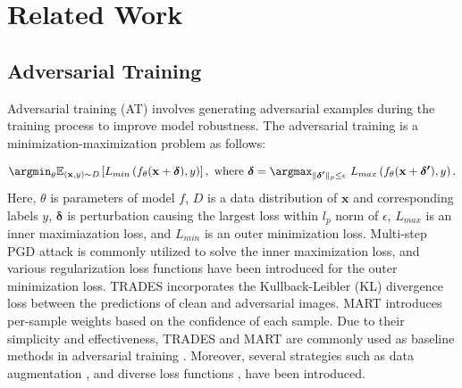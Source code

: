 \documentclass{article} %
\begin{document}

\section{Related Work}

\subsection{Adversarial Training}
Adversarial training (AT) involves generating adversarial examples during the training process to improve model robustness.
The adversarial training is a minimization-maximization problem as follows:

\begin{equation}\label{eq:basic_adv}
\begin{split}
    \argmin_{\theta}  \mathbb{E}_{(\mathbf{x}, y)\sim \mathit{D}}\left [    L_{min}\left (f_{\theta}(\mathbf{x}+\boldsymbol{\delta}), y \right ) \right  ], \ 
    \text{where} \ \boldsymbol{\delta} = \argmax_{ \| \boldsymbol{\delta'} \|_p \leq \epsilon}\ L_{max}\left (f_{\theta}(\mathbf{x}+\boldsymbol{\delta'}), y \right ).
\end{split}
\end{equation}
Here, $\theta$ is parameters of model $f$, $\mathit{D}$ is a data distribution of $\mathbf{x}$ and corresponding labels $y$, 
$\boldsymbol{\delta}$ is perturbation causing the largest loss within $l_p$ norm of $\epsilon$, $L_{max}$ is an inner maximiazation loss, and $L_{min}$ is an outer minimization loss.
Multi-step PGD attack \citep{PGD} is commonly utilized to solve the inner maximization loss, and various regularization loss functions have been introduced for the outer minimization loss.
TRADES \citep{TRADES} incorporates the Kullback-Leibler (KL) divergence loss between the predictions of clean and adversarial images.
MART\citep{MART} introduces per-sample weights based on the confidence of each sample.
Due to their simplicity and effectiveness, TRADES and MART are commonly used as baseline methods in adversarial training \citep{2020_awp,bai2021improving, jin2022enhancing, tack2022consistency, jin2023randomized,wei2023cfa, qin2019adversarial}. 
Moreover, several strategies such as data augmentation \citep{rebuffi2021fixing, li2023data}, and diverse loss functions \citep{2020_awp}, have been introduced. 
\end{document}
